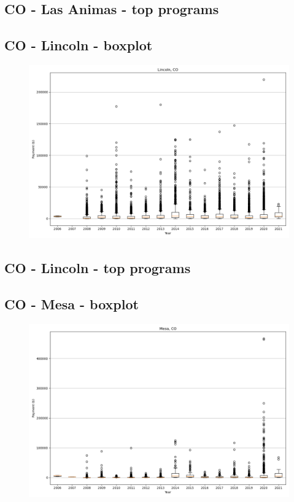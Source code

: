 \subsection*{CO - Las Animas - top programs}

\newpage
\subsection*{CO - Lincoln - boxplot}
\begin{figure}[h]
\centering
\includegraphics[width=7in]{../output/boxplots/counties/Lincoln-CO_boxplot.png}
\end{figure}


\subsection*{CO - Lincoln - top programs}

\newpage
\subsection*{CO - Mesa - boxplot}
\begin{figure}[h]
\centering
\includegraphics[width=7in]{../output/boxplots/counties/Mesa-CO_boxplot.png}
\end{figure}


